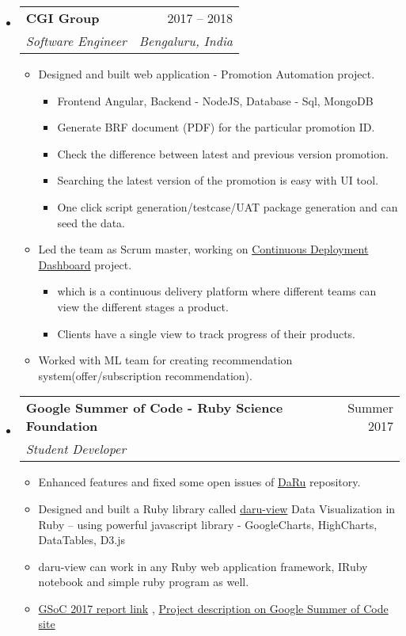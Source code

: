 \documentclass[letterpaper,12pt]{article}[leftmargin=*]
\makeatletter
\def \entryspacing {-0pt}
\newcommand{\resumeEntryStart}{\begin{itemize}[leftmargin=2.5mm]}
\newcommand{\resumeEntryEnd}{\end{itemize}\vspace{\entryspacing}}
\newcommand{\resumeItemListStart}{\begin{itemize}[leftmargin=4.5mm]}
\newcommand{\resumeItemListEnd}{\end{itemize}}
\newcommand{\resumeItem}[1]{
  \item\small{
    {#1 \vspace{-2pt}}
  }
}
\newcommand{\resumeEntryTSDL}[4]{
  \vspace{-1pt}\item[]
    \begin{tabular*}{0.97\textwidth}{l@{\extracolsep{\fill}}r}
      \textbf{\color{primary}#1} & {\firabook\color{accent}\small#2} \\
      \textit{\color{accent}\small#3} & \textit{\color{accent}\small#4} \\
    \end{tabular*}\vspace{-6pt}
}
\makeatother
\begin{document}
  \resumeEntryStart
    \resumeEntryTSDL
      {CGI Group}{ 2017 -- 2018}
      {Software Engineer}{Bengaluru, India}
    \resumeItemListStart
      \resumeItem {Designed and built web application - Promotion Automation project.}
      \begin{itemize}
         \item Frontend Angular, Backend - NodeJS, Database - Sql, MongoDB
         \item Generate BRF document (PDF) for the particular promotion ID.
         \item Check the difference between latest and previous version promotion.
         \item Searching the latest version of the promotion is easy with UI tool.
         \item One click script generation/testcase/UAT package generation and can seed the data.
       \end{itemize}
      \resumeItem {Led the team as Scrum master, working on \href{http://slides.com/shekharrajak/dd/}{Continuous Deployment Dashboard} project. }
      \begin{itemize}
          \item which is a continuous delivery platform where different teams can view the different stages a product.
          \item Clients have a single view to track progress of their products.
      \end{itemize}
      \resumeItem {Worked with ML team for creating recommendation system(offer/subscription recommendation).}
    \resumeItemListEnd
  \resumeEntryEnd


  \resumeEntryStart
    \resumeEntryTSDL
      {Google Summer of Code - Ruby Science Foundation}{Summer 2017}
      {Student Developer}{}
    \resumeItemListStart
        \resumeItem {Enhanced features and fixed some open issues of \href{https://github.com/SciRuby/daru/}{DaRu} repository.}
        \resumeItem {Designed and built a Ruby library called \href{https://github.com/SciRuby/daru-view/}{daru-view} Data Visualization
in Ruby -- using powerful javascript library - GoogleCharts, HighCharts,
DataTables, D3.js}
        \resumeItem {daru-view can work in any Ruby web application framework, IRuby notebook and simple ruby program as well.}
        \resumeItem {\href{https://shekharrajak.github.io/gsoc_2017_posts/}{GSoC 2017 report link}},
        \href{https://summerofcode.withgoogle.com/archive/2017/projects/5267803426783232/}{Project description on Google Summer of Code site}
    \resumeItemListEnd
  \resumeEntryEnd
\end{document}
